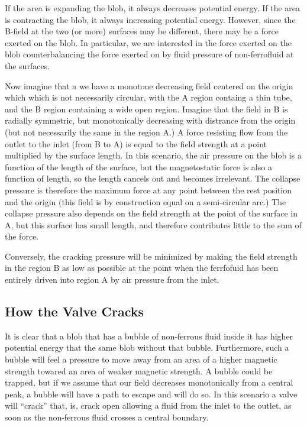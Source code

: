 \documentclass[]{asme2ej}
\begin{document}
If the area is expanding the blob, it always decreases potential
energy. If the area is contracting the blob, it always increasing
potential energy. However, since the B-field at the two (or more)
surfaces may be different, there may be a force exerted on the
blob. In particular, we are interested in the force exerted on
the blob counterbalancing the force exerted on by fluid pressure
of non-ferrofluid at the surfaces.

Now imagine that a we have a monotone decreasing field centered
on the origin which which is not necessarily circular, with
the A region containg a thin tube, and the B region containing
a wide open region. Imagine that the field in B is radially
symmetric, but monotonically decreasing with distrance from
the origin (but not necessarily the same in the region A.)
A force resisting flow from the outlet to the inlet (from B to A)
is equal to the field strength at a point multiplied by the surface
length.
In this scenario, the air pressure on the blob is a function
of the length of the surface, but the magnetostatic force is
also a function of length, so the length cancels out and becomes
irrelevant.
The collapse pressure is therefore the maximum force at any point between the rest position and the origin
(this field is by construction equal on a semi-circular arc.)
The collapse pressure also depends on the field strength
at the point of the surface in A, but this surface has small length,
and therefore contributes little to the sum of the force.

Conversely, the cracking pressure will be minimized by
making the field strength in the region B as low as possible
at the point when the ferrfofuid has been entirely driven into
region A by air pressure from the inlet.

\subsection{How the Valve Cracks}

It is clear that a blob that has a bubble of non-ferrous fluid inside it
has higher potential energy that the same blob without that bubble.
Furthermore, such a bubble will feel a pressure to move away from
an area of a higher magnetic strength towared an area of weaker magnetic
strength. A bubble could be trapped, but if we assume that our
field decreases monotonically from a central peak, a bubble
will have a path to escape and will do so.
In this scenario a valve will ``crack'' that, is, crack open
allowing a fluid from the inlet to the outlet, as soon as the
non-ferrous fluid crosses a central boundary.
\end{document}
